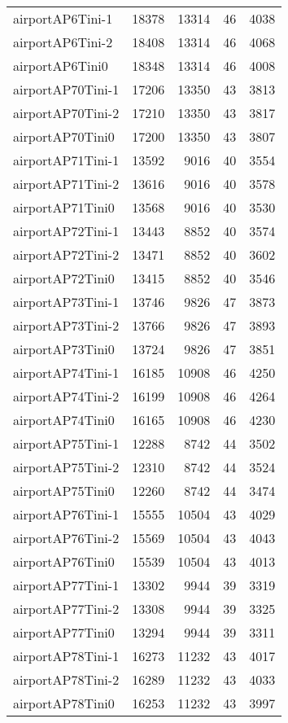 \begin{longtable}{lrrrr}
airportAP6Tini-1 & 18378 & 13314 & 46 & 4038 \\
airportAP6Tini-2 & 18408 & 13314 & 46 & 4068 \\
airportAP6Tini0 & 18348 & 13314 & 46 & 4008 \\
airportAP70Tini-1 & 17206 & 13350 & 43 & 3813 \\
airportAP70Tini-2 & 17210 & 13350 & 43 & 3817 \\
airportAP70Tini0 & 17200 & 13350 & 43 & 3807 \\
airportAP71Tini-1 & 13592 & 9016 & 40 & 3554 \\
airportAP71Tini-2 & 13616 & 9016 & 40 & 3578 \\
airportAP71Tini0 & 13568 & 9016 & 40 & 3530 \\
airportAP72Tini-1 & 13443 & 8852 & 40 & 3574 \\
airportAP72Tini-2 & 13471 & 8852 & 40 & 3602 \\
airportAP72Tini0 & 13415 & 8852 & 40 & 3546 \\
airportAP73Tini-1 & 13746 & 9826 & 47 & 3873 \\
airportAP73Tini-2 & 13766 & 9826 & 47 & 3893 \\
airportAP73Tini0 & 13724 & 9826 & 47 & 3851 \\
airportAP74Tini-1 & 16185 & 10908 & 46 & 4250 \\
airportAP74Tini-2 & 16199 & 10908 & 46 & 4264 \\
airportAP74Tini0 & 16165 & 10908 & 46 & 4230 \\
airportAP75Tini-1 & 12288 & 8742 & 44 & 3502 \\
airportAP75Tini-2 & 12310 & 8742 & 44 & 3524 \\
airportAP75Tini0 & 12260 & 8742 & 44 & 3474 \\
airportAP76Tini-1 & 15555 & 10504 & 43 & 4029 \\
airportAP76Tini-2 & 15569 & 10504 & 43 & 4043 \\
airportAP76Tini0 & 15539 & 10504 & 43 & 4013 \\
airportAP77Tini-1 & 13302 & 9944 & 39 & 3319 \\
airportAP77Tini-2 & 13308 & 9944 & 39 & 3325 \\
airportAP77Tini0 & 13294 & 9944 & 39 & 3311 \\
airportAP78Tini-1 & 16273 & 11232 & 43 & 4017 \\
airportAP78Tini-2 & 16289 & 11232 & 43 & 4033 \\
airportAP78Tini0 & 16253 & 11232 & 43 & 3997 \\

\end{longtable}
